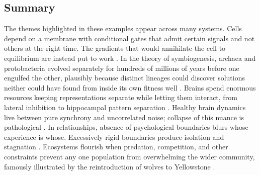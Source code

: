 \documentclass[11pt]{article}
\begin{document}








\subsection{Summary} 


The themes highlighted in these examples appear across many systems. Cells depend on a membrane with conditional gates that admit certain signals and not others at the right time. The gradients that would annihilate the cell to equilibrium are instead put to work \citep{alberts2022molecular}. In the theory of symbiogenesis, archaea and protobacteria evolved separately for hundreds of millions of years before one engulfed the other, plausibly because distinct lineages could discover solutions neither could have found from inside its own fitness well \citep{margulis1995what, lane2010energetics}. Brains spend enormous resources keeping representations separate while letting them interact, from lateral inhibition to hippocampal pattern separation \citep{kurth2023replay}. Healthy brain dynamics live between pure synchrony and uncorrelated noise; collapse of this nuance is pathological \citep{beggs2003neuronal, hammond2007pathological}. In relationships, absence of psychological boundaries blurs whose experience is whose. Excessively rigid boundaries produce isolation and stagnation \citep{gabbard1995boundaries, perls1951gestalt, minuchin1974families}. Ecosystems flourish when predation, competition, and other constraints prevent any one population from overwhelming the wider community, famously illustrated by the reintroduction of wolves to Yellowstone \citep{ripple2012trophic}.
\end{document}
